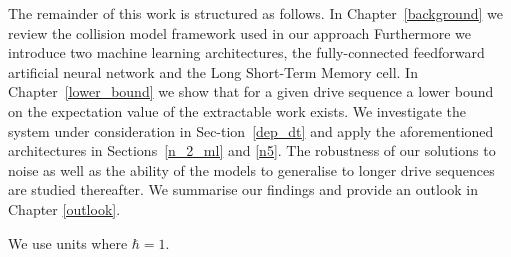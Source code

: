 The remainder of this work is structured as follows.
In Chapter~\ref{background} we review the collision model framework used in our approach
Furthermore we introduce two machine learning architectures, the fully-connected feedforward artificial neural network and the Long Short-Term Memory cell.
In Chapter~\ref{lower_bound} we show that for a given drive sequence a lower bound on the expectation value of the extractable work exists.
We investigate the system under consideration in Sec-tion~\ref{dep_dt} and apply the aforementioned architectures in Sections~\ref{n_2_ml} and \ref{n5}.
The robustness of our solutions to noise as well as the ability of the models to generalise to longer drive sequences are studied thereafter.
We summarise our findings and provide an outlook in Chapter \ref{outlook}.

We use units where $\hbar = 1$.